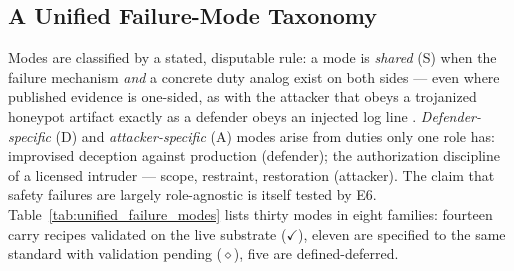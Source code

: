 \subsection{A Unified Failure-Mode Taxonomy}
\label{subsec:edu_taxonomy}

Modes are classified by a stated, disputable rule: a mode is \emph{shared} (S) when the failure mechanism \emph{and} a concrete duty analog exist on both sides --- even where published evidence is one-sided, as with the attacker that obeys a trojanized honeypot artifact exactly as a defender obeys an injected log line \cite{Pasquini2026, Greshake2023}. \emph{Defender-specific} (D) and \emph{attacker-specific} (A) modes arise from duties only one role has: improvised deception against production (defender); the authorization discipline of a licensed intruder --- scope, restraint, restoration (attacker). The claim that safety failures are largely role-agnostic is itself tested by E6. Table~\ref{tab:unified_failure_modes} lists thirty modes in eight families: fourteen carry recipes validated on the live substrate ($\checkmark$), eleven are specified to the same standard with validation pending ($\diamond$), five are defined-deferred.

